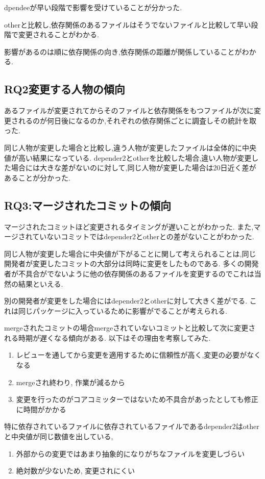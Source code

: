 \documentclass[submit,ses,noauthor]{ipsj} %
\begin{document}
dpendeeが早い段階で影響を受けていることが分かった.

otherと比較し,依存関係のあるファイルはそうでないファイルと比較して早い段階で変更されることがわかる.

影響があるのは順に依存関係の向き,依存関係の距離が関係していることがわかる.



\subsection{RQ2変更する人物の傾向}
あるファイルが変更されてからそのファイルと依存関係をもつファイルが次に変更されるのが何日後になるのか,それぞれの依存関係ごとに調査しその統計を取った.

同じ人物が変更した場合と比較し,違う人物が変更したファイルは全体的に中央値が高い結果になっている.
depender2とotherを比較した場合,違い人物が変更した場合には大きな差がないのに対して,同じ人物が変更した場合は20日近く差があることが分かった.


\subsection{RQ3:マージされたコミットの傾向}
マージされたコミットほど変更されるタイミングが遅いことがわかった.
また,マージされていないコミットではdepender2とotherとの差がないことがわかった.




同じ人物が変更した場合に中央値が下がることに関して考えられることは,同じ開発者が変更したコミットの大部分は同時に変更をしたものである.
多くの開発者が不具合がでないように他の依存関係のあるファイルを変更するのでこれは当然の結果といえる.

別の開発者が変更をした場合にはdepender2とotherに対して大きく差がでる.
これは同じパッケージに入っているために影響がでることが考えられる.



mergeされたコミットの場合mergeされていないコミットと比較して次に変更される時期が遅くなる傾向がある.
以下はその理由を考察してみた.
\begin{enumerate}
\item レビューを通してから変更を適用するために信頼性が高く,変更の必要がなくなる
\item mergeされ終わり, 作業が減るから
\item 変更を行ったのがコアコミッターではないため不具合があったとしても修正に時間がかかる
\end{enumerate}

特に依存されているファイルに依存されているファイルであるdepender2はotherと中央値が同じ数値を出している,
\begin{enumerate}
\item 外部からの変更ではあまり抽象的になりがちなファイルを変更しづらい
\item 絶対数が少ないため, 変更されにくい
\end{enumerate}
\end{document}
